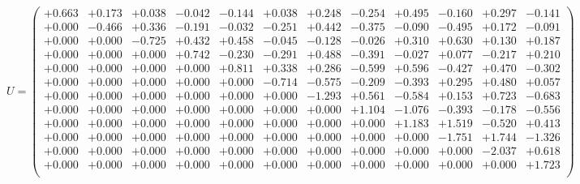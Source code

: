 \documentclass[9pt]{article}
\theoremstyle{plain}
\theoremstyle{definition}
\theoremstyle{remark}
\numberwithin{equation}{section}
\begin{document}
$U = \left(
\begin{array}{
cccccccccccc}
+0.663 & +0.173 & +0.038 & -0.042 & -0.144 & +0.038 & +0.248 & -0.254 & +0.495 & -0.160 & +0.297 & -0.141 \\
+0.000 & -0.466 & +0.336 & -0.191 & -0.032 & -0.251 & +0.442 & -0.375 & -0.090 & -0.495 & +0.172 & -0.091 \\
+0.000 & +0.000 & -0.725 & +0.432 & +0.458 & -0.045 & -0.128 & -0.026 & +0.310 & +0.630 & +0.130 & +0.187 \\
+0.000 & +0.000 & +0.000 & +0.742 & -0.230 & -0.291 & +0.488 & -0.391 & -0.027 & +0.077 & -0.217 & +0.210 \\
+0.000 & +0.000 & +0.000 & +0.000 & +0.811 & +0.338 & +0.286 & -0.599 & +0.596 & -0.427 & +0.470 & -0.302 \\
+0.000 & +0.000 & +0.000 & +0.000 & +0.000 & -0.714 & -0.575 & -0.209 & -0.393 & +0.295 & +0.480 & +0.057 \\
+0.000 & +0.000 & +0.000 & +0.000 & +0.000 & +0.000 & -1.293 & +0.561 & -0.584 & +0.153 & +0.723 & -0.683 \\
+0.000 & +0.000 & +0.000 & +0.000 & +0.000 & +0.000 & +0.000 & +1.104 & -1.076 & -0.393 & -0.178 & -0.556 \\
+0.000 & +0.000 & +0.000 & +0.000 & +0.000 & +0.000 & +0.000 & +0.000 & +1.183 & +1.519 & -0.520 & +0.413 \\
+0.000 & +0.000 & +0.000 & +0.000 & +0.000 & +0.000 & +0.000 & +0.000 & +0.000 & -1.751 & +1.744 & -1.326 \\
+0.000 & +0.000 & +0.000 & +0.000 & +0.000 & +0.000 & +0.000 & +0.000 & +0.000 & +0.000 & -2.037 & +0.618 \\
+0.000 & +0.000 & +0.000 & +0.000 & +0.000 & +0.000 & +0.000 & +0.000 & +0.000 & +0.000 & +0.000 & +1.723 \\
\end{array}
\right)$ \newline 
\end{document}
